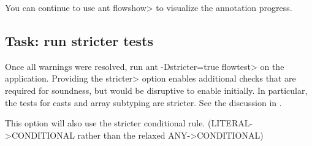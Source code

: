 You can continue to use \<ant flowshow> to visualize the annotation
progress.

\subsection{Task: run stricter tests}
Once all warnings were resolved, run \<ant -Dstricter=true flowtest> on
the application.
Providing the \<stricter> option enables additional checks that are
required for soundness, but would be disruptive to enable initially.
In particular, the tests for casts and array subtyping are stricter.
See the discussion in .

This option will also use the stricter conditional rule. (LITERAL-\textgreater CONDITIONAL rather than the relaxed ANY-\textgreater CONDITIONAL)



